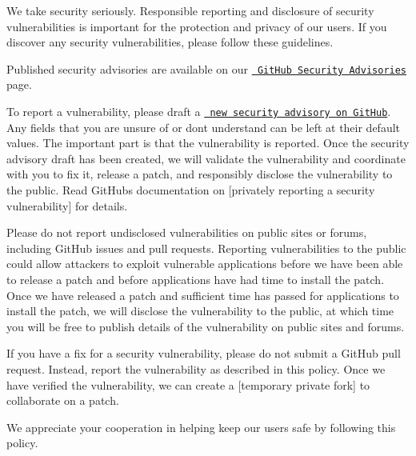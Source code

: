 We take security seriously. Responsible reporting and disclosure of security vulnerabilities is important for the protection and privacy of our users. If you discover any security vulnerabilities, please follow these guidelines.

Published security advisories are available on our \href{https://github.com/KillianLucas/open-interpreter/security/advisories}{\texttt{ Git\+Hub Security Advisories}} page.

To report a vulnerability, please draft a \href{https://github.com/KillianLucas/open-interpreter/security/advisories/new}{\texttt{ new security advisory on Git\+Hub}}. Any fields that you are unsure of or don\textquotesingle{}t understand can be left at their default values. The important part is that the vulnerability is reported. Once the security advisory draft has been created, we will validate the vulnerability and coordinate with you to fix it, release a patch, and responsibly disclose the vulnerability to the public. Read Git\+Hub\textquotesingle{}s documentation on \mbox{[}privately reporting a security vulnerability\mbox{]} for details.

Please do not report undisclosed vulnerabilities on public sites or forums, including Git\+Hub issues and pull requests. Reporting vulnerabilities to the public could allow attackers to exploit vulnerable applications before we have been able to release a patch and before applications have had time to install the patch. Once we have released a patch and sufficient time has passed for applications to install the patch, we will disclose the vulnerability to the public, at which time you will be free to publish details of the vulnerability on public sites and forums.

If you have a fix for a security vulnerability, please do not submit a Git\+Hub pull request. Instead, report the vulnerability as described in this policy. Once we have verified the vulnerability, we can create a \mbox{[}temporary private fork\mbox{]} to collaborate on a patch.

We appreciate your cooperation in helping keep our users safe by following this policy. 